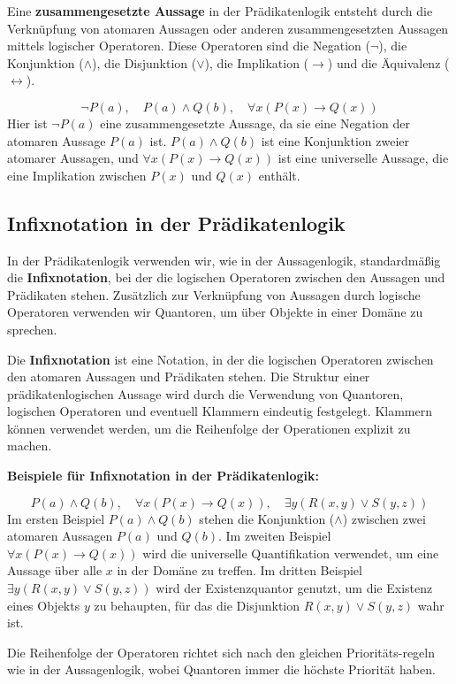\documentclass[main.tex]{subfiles}
\begin{document}
\begin{definition}
Eine \textbf{zusammengesetzte Aussage} in der Prädikatenlogik entsteht durch die Verknüpfung von atomaren Aussagen oder anderen zusammengesetzten Aussagen mittels logischer Operatoren. Diese Operatoren sind die Negation (\(\neg\)), die Konjunktion (\(\land\)), die Disjunktion (\(\lor\)), die Implikation (\(\rightarrow\)) und die Äquivalenz (\(\leftrightarrow\)).

\begin{example}
\[
\neg P(a), \quad P(a) \land Q(b), \quad \forall x (P(x) \rightarrow Q(x))
\]
Hier ist \(\neg P(a)\) eine zusammengesetzte Aussage, da sie eine Negation der atomaren Aussage \(P(a)\) ist. \(P(a) \land Q(b)\) ist eine Konjunktion zweier atomarer Aussagen, und \(\forall x (P(x) \rightarrow Q(x))\) ist eine universelle Aussage, die eine Implikation zwischen \(P(x)\) und \(Q(x)\) enthält.
\end{example}
\end{definition}

\subsection{Infixnotation in der Prädikatenlogik}

In der Prädikatenlogik verwenden wir, wie in der Aussagenlogik, standardmäßig die \textbf{Infixnotation}, bei der die logischen Operatoren zwischen den Aussagen und Prädikaten stehen. Zusätzlich zur Verknüpfung von Aussagen durch logische Operatoren verwenden wir Quantoren, um über Objekte in einer Domäne zu sprechen. 

\begin{definition}
Die \textbf{Infixnotation} ist eine Notation, in der die logischen Operatoren zwischen den atomaren Aussagen und Prädikaten stehen. Die Struktur einer prädikatenlogischen Aussage wird durch die Verwendung von Quantoren, logischen Operatoren und eventuell Klammern eindeutig festgelegt. Klammern können verwendet werden, um die Reihenfolge der Operationen explizit zu machen.

\textbf{Beispiele für Infixnotation in der Prädikatenlogik:}
\begin{example}
    \[
    P(a) \land Q(b), \quad \forall x (P(x) \rightarrow Q(x)), \quad \exists y (R(x, y) \lor S(y, z))
    \]
    Im ersten Beispiel \(P(a) \land Q(b)\) stehen die Konjunktion (\(\land\)) zwischen zwei atomaren Aussagen \(P(a)\) und \(Q(b)\). Im zweiten Beispiel \(\forall x (P(x) \rightarrow Q(x))\) wird die universelle Quantifikation verwendet, um eine Aussage über alle \(x\) in der Domäne zu treffen. Im dritten Beispiel \(\exists y (R(x, y) \lor S(y, z))\) wird der Existenzquantor genutzt, um die Existenz eines Objekts \(y\) zu behaupten, für das die Disjunktion \(R(x, y) \lor S(y, z)\) wahr ist.
\end{example}

Die Reihenfolge der Operatoren richtet sich nach den gleichen Prioritäts-regeln wie in der Aussagenlogik, wobei Quantoren immer die höchste Priorität haben.
\end{definition}
\end{document}
